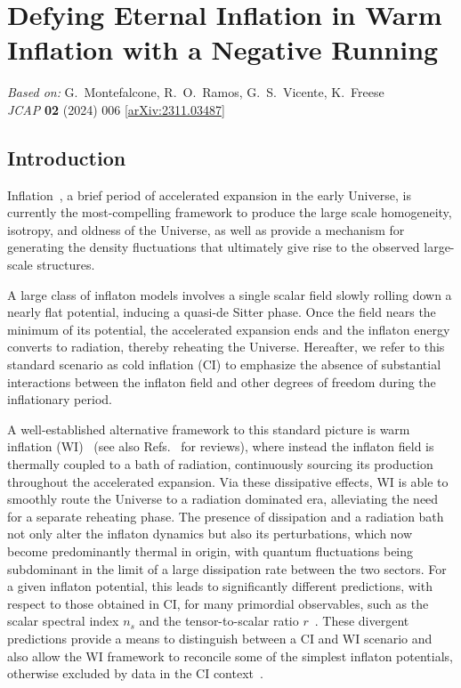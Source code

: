 \chapter{Defying Eternal Inflation in Warm Inflation with a Negative Running}
\label{ch:wi-eternal}

\begin{center}
\textit{Based on:} G.~Montefalcone, R.~O.~Ramos, G.~S.~Vicente, K.~Freese\\
\textit{JCAP} \textbf{02} (2024) 006
[\href{https://arxiv.org/abs/2311.03487}{arXiv:2311.03487}]
\end{center}
\vspace{1em}


\section{Introduction}
\label{sec:ch3-intro}
Inflation~\cite{Guth:1980zm, Linde:1981mu, Albrecht:1982wi, Kazanas:1980tx, Starobinsky:1980te, Sato:1980yn, Mukhanov:1981xt, Linde:1983gd, Mukhanov:1990me}, a brief period of accelerated expansion in the early Universe, is currently the most-compelling framework to produce the large scale homogeneity, isotropy, and oldness of the Universe, as well as provide a mechanism for generating the density fluctuations that ultimately give rise to the observed large-scale
structures.

A large class of inflaton models involves a single scalar field slowly rolling down a nearly
flat potential, inducing a quasi-de Sitter phase. Once the field nears the minimum of its potential, the accelerated expansion ends and the inflaton energy converts to
radiation, thereby reheating the Universe.
Hereafter, we refer to this standard scenario as cold inflation (CI) to emphasize the absence of substantial interactions between the inflaton field and other degrees of freedom during the inflationary period.

A well-established alternative framework to this standard picture is warm inflation (WI)~\cite{Berera:1995ie} (see
also Refs.~\cite{Berera:2008ar,Bastero-Gil:2009sdq,Kamali:2023lzq} for
reviews), where instead the inflaton field  is thermally coupled to a bath of radiation, continuously sourcing its production throughout the accelerated expansion.
Via these
dissipative effects, WI is able to smoothly route the Universe to
a radiation dominated era, alleviating the need for a separate
reheating phase.
The presence of dissipation and a radiation bath not only alter the inflaton dynamics but also its perturbations, which now become predominantly thermal in origin, with quantum fluctuations being subdominant in the limit of a
large dissipation rate between the two sectors. For a given inflaton
potential, this leads to significantly different predictions, with respect to those obtained in CI, for many
primordial observables, such as the scalar spectral index $n_s$ and
the tensor-to-scalar ratio $r$~\cite{Bartrum:2013fia,Bastero-Gil:2014raa,Bastero-Gil:2016qru,Bastero-Gil:2019gao}. These divergent predictions provide a means to distinguish between a CI and WI scenario and also allow the WI framework to reconcile some of the simplest inflaton potentials, otherwise excluded by data in the CI context~\cite{Benetti:2016jhf}.

